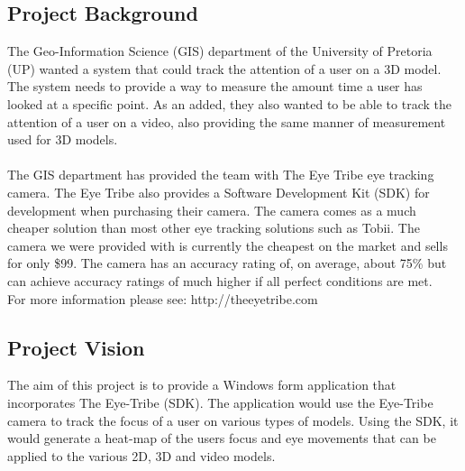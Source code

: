 \subsection{Project Background}
The Geo-Information Science (GIS) department of the University of Pretoria (UP) wanted a system that could track the attention of a user on a 3D model. The system needs to provide a way to measure the amount time a user has looked at a specific point. As an added, they also wanted to be able to track the attention of a user on a video, also providing the same manner of measurement used for 3D models.\\
\\
The GIS department has provided the team with The Eye Tribe eye tracking camera. The Eye Tribe also provides a Software Development Kit (SDK) for development when purchasing their camera. The camera comes as a much cheaper solution than most other eye tracking solutions such as Tobii. The camera we were provided with is currently the cheapest on the market and sells for only \$99. The camera has an accuracy rating of, on average, about 75\% but can achieve accuracy ratings of much higher if all perfect conditions are met. \\
For more information please see: http://theeyetribe.com

\subsection{Project Vision}
The aim of this project is to provide a Windows form application that incorporates The Eye-Tribe (SDK). The application would use the Eye-Tribe camera to track the focus of a user on various types of  models. Using the SDK, it would generate a heat-map of the users focus and eye movements that can be applied to the various 2D, 3D and video models.
